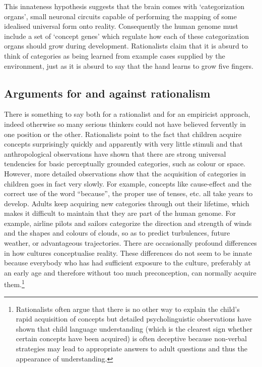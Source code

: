 This innateness hypothesis suggests that the brain comes
with `categorization organs', small neuronal circuits
capable of performing 
the mapping of some idealised universal form onto
reality. Consequently the human genome
must include a set of `concept genes' which regulate how each of 
these categorization organs should grow during 
development. Rationalists claim
that it is absurd to think of categories as being 
learned from example cases supplied by the environment, just 
as it is absurd to say that the hand learns to 
grow five fingers.

\subsection{Arguments for and against rationalism}

There is something to say both for a rationalist and 
for an empiricist approach, indeed otherwise so many
serious thinkers could not have believed fervently 
in one position or the other. Rationalists point to the 
fact that children acquire concepts
surprisingly quickly and apparently with very little stimuli
and that anthropological observations have 
shown that there are strong universal tendencies
for basic perceptually grounded categories, such as colour or 
space. However, more detailed observations show
that the acquisition of categories in children goes 
in fact very slowly. For example, concepts like cause-effect
and the correct use of the word ``because'', the proper
use of tenses, etc. all take years to develop. 
Adults keep acquiring
new categories through out their lifetime, which makes 
it difficult to maintain that they are part of the 
human genome. For example, 
airline pilots and sailors categorize the direction and 
strength of winds and the shapes and colours of clouds, 
so as to predict turbulences, future weather, or 
advantageous trajectories. There are
occasionally profound differences in how cultures conceptualise
reality. These differences do not seem to be innate because
everybody who has had sufficient exposure to the 
culture, preferably at an early age and therefore without too much 
preconception, can normally acquire them.\footnote{
Rationalists often argue that there is no other way 
to explain the child's rapid acquisition of concepts
but detailed psycholinguistic observations have shown that 
child language understanding (which is the 
clearest sign whether certain concepts have been acquired)
is often deceptive because 
non-verbal strategies may lead to appropriate answers
to adult questions and thus the appearance of 
understanding.}

